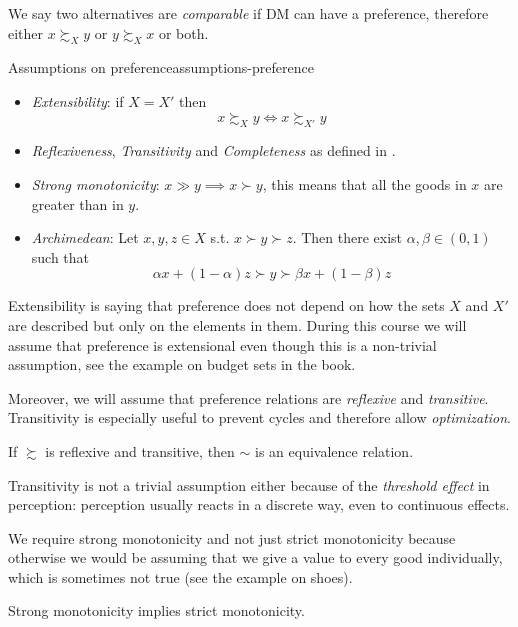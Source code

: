 \documentclass[12pt]{extarticle}
\begin{document}
We say two alternatives are \emph{comparable} if DM can have a preference, therefore either $x \succsim_X y$ or $y \succsim_X x$ or both.

\begin{proposition}{Assumptions on preference}{assumptions-preference}
    \begin{itemize}
        \item
              \emph{Extensibility}: if $X = X'$ then
              \begin{equation}
                  x \succsim_X y \iff x \succsim_{X'} y
              \end{equation}
        \item \emph{Reflexiveness}, \emph{Transitivity} and \emph{Completeness} as defined in .
        \item \emph{Strong monotonicity}: $x \gg y \implies x \succ y$, this means that all the goods in $x$ are greater than in $y$.
        \item \emph{Archimedean}: Let $x, y, z \in X$ s.t. $x \succ y \succ z$.
              Then there exist $\alpha, \beta \in (0, 1)$ such that
              \begin{equation}
                  \alpha x + (1-\alpha) z \succ y \succ \beta x + (1-\beta)z
              \end{equation}
    \end{itemize}
\end{proposition}

Extensibility is saying that preference does not depend on how the sets $X$ and $X'$ are described but only on the elements in them.
During this course we will assume that preference is extensional even though this is a non-trivial assumption, see the example on budget sets in the book.

Moreover, we will assume that preference relations are \emph{reflexive} and \emph{transitive}.
Transitivity is especially useful to prevent cycles and therefore allow \emph{optimization}.

\begin{corollary}{}{}
    If $\succsim$ is reflexive and transitive, then $\sim$ is an equivalence relation.
\end{corollary}

Transitivity is not a trivial assumption either because of the \emph{threshold effect} in perception:
perception usually reacts in a discrete way, even to continuous effects.

We require strong monotonicity and not just strict monotonicity because otherwise we would be assuming that we give a value to every good individually, which is sometimes not true (see the example on shoes).

\begin{corollary}{}{}
    Strong monotonicity implies strict monotonicity.
\end{corollary}
\end{document}
